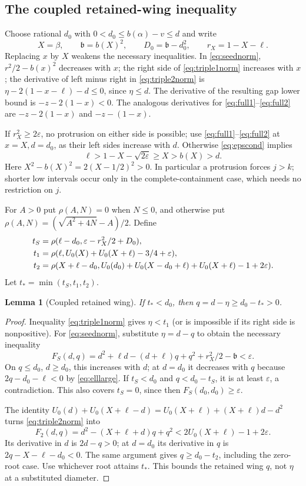 \documentclass[10pt]{amsart}
\newtheorem{lemma}{Lemma}[section]
\theoremstyle{remark}
\begin{document}
\subsection{The coupled retained-wing inequality}
Choose rational $d_0$ with $0<d_0\le b(\alpha)-v\le d$ and write
\[
 X=\beta,\qquad \mathfrak b=b(X)^2,\qquad D_0=\mathfrak b-d_0^2,
 \qquad r_X=1-X-\ell.
\]
Replacing $x$ by $X$ weakens the necessary inequalities.
In \eqref{eq:seednorm}, $r^2/2-b(x)^2$ decreases with $x$;
the right side of \eqref{eq:triple1norm} increases with $x$;
the derivative of left minus right in \eqref{eq:triple2norm} is
$\eta-2(1-x-\ell)-d\le0$, since $\eta\le d$.
The derivative of the resulting gap lower bound is
$-z-2(1-x)<0$. The analogous derivatives for
\eqref{eq:full1}--\eqref{eq:full2} are $-z-2(1-x)$ and $-z-(1-x)$.

If $r_X^2\ge2\varepsilon$, no protrusion on either side is possible;
use \eqref{eq:full1}--\eqref{eq:full2} at $x=X,d=d_0$, as their left
sides increase with $d$. Otherwise \eqref{eq:epscond} implies
\begin{equation}\label{eq:elllarge}
 \ell>1-X-\sqrt{2\varepsilon}\ge X>b(X)>d.
\end{equation}
Here $X^2-b(X)^2=2(X-1/2)^2>0$. In particular a protrusion forces
$j>k$; shorter low intervals occur only in the complete-containment
case, which needs no restriction on $j$.

For $A>0$ put $\rho(A,N)=0$ when $N\le0$, and otherwise put
$\rho(A,N)=(\sqrt{A^2+4N}-A)/2$. Define
\begin{align}
 t_S&=\rho(\ell-d_0,\varepsilon-r_X^2/2+D_0),\notag\\
 t_1&=\rho(\ell,U_0(X)+U_0(X+\ell)-3/4+\varepsilon),\label{eq:roots}\\
 t_2&=\rho(X+\ell-d_0,
 U_0(d_0)+U_0(X-d_0+\ell)+U_0(X+\ell)-1+2\varepsilon).\notag
\end{align}
Let $t_* =\min(t_S,t_1,t_2)$.
\begin{lemma}[Coupled retained wing]\label{lem:coupled}
If $t_*<d_0$, then $q=d-\eta\ge d_0-t_*>0$.
\end{lemma}
\begin{proof}
Inequality \eqref{eq:triple1norm} gives $\eta<t_1$ (or is impossible
if its right side is nonpositive). For \eqref{eq:seednorm}, substitute
$\eta=d-q$ to obtain the necessary inequality
\[
 F_S(d,q)=d^2+\ell d-(d+\ell)q+q^2+r_X^2/2-\mathfrak b
 <\varepsilon.
\]
On $q\le d_0$, $d\ge d_0$, this increases with $d$; at $d=d_0$
it decreases with $q$ because $2q-d_0-\ell<0$ by
\eqref{eq:elllarge}. If $t_S<d_0$ and $q<d_0-t_S$, it is at least
$\varepsilon$, a contradiction. This also covers $t_S=0$, since
then $F_S(d_0,d_0)\ge\varepsilon$.

The identity $U_0(d)+U_0(X+\ell-d)=U_0(X+\ell)+(X+\ell)d-d^2$
turns \eqref{eq:triple2norm} into
\[
 F_2(d,q)=d^2-(X+\ell+d)q+q^2<2U_0(X+\ell)-1+2\varepsilon.
\]
Its derivative in $d$ is $2d-q>0$; at $d=d_0$ its derivative in $q$
is $2q-X-\ell-d_0<0$. The same argument gives $q\ge d_0-t_2$,
including the zero-root case. Use whichever root attains $t_*$.
This bounds the retained wing $q$, not $\eta$ at a substituted
diameter.
\end{proof}
\end{document}
